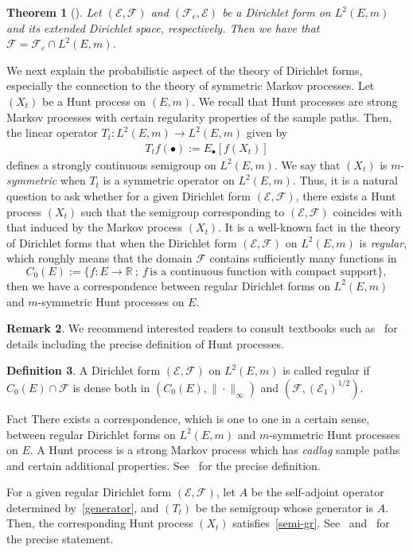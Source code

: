 \documentclass[10pt]{amsart}
\newtheorem{theo}{Theorem}[section]
\theoremstyle{definition}\newtheorem{defi}[theo]{Definition}\newtheorem{rema}[theo]{Remark}\newtheorem{exam}[theo]{Example}\newtheorem{exem}[theo]{Example}\newtheorem{nota}[theo]{Notation}
\newcommand{\ce}{\mathcal{E}}
\newcommand{\cf}{\mathcal{F}}
\newcommand{\br}{\mathbb{R}}
\begin{document}
\begin{theo}[{\cite[Theorem~1.5.2]{FOT}}]\label{ex-dr}
Let $(\ce,\cf)$ and $(\cf_e,\ce)$ be a Dirichlet form on $L^2(E,m)$ and its extended Dirichlet space, respectively. Then we have that $\cf=\cf_e\cap L^2(E,m)$.
\end{theo}

We next explain the probabilistic aspect of the theory of Dirichlet forms, especially the connection to the theory of symmetric Markov processes. Let $(X_t)$ be a Hunt process on $(E,m)$. We recall that Hunt processes are strong Markov processes with certain regularity properties of the sample paths. Then, the linear operator $T_t:L^2(E,m)\to L^2(E,m)$ given by
\begin{align}\label{semi-gr}
T_tf(\bullet):=E_{\bullet}[f(X_t)]
\end{align}
defines a strongly continuous semigroup on $L^2(E,m)$. We say that $(X_t)$ is $m$-\emph{symmetric} when $T_t$ is a symmetric operator on $L^2(E,m)$. Thus, it is a natural question to ask whether for a given Dirichlet form $(\ce,\cf)$, there exists a Hunt process $(X_t)$ such that the semigroup corresponding to $(\ce,\cf)$ coincides with that induced by the Markov process $(X_t)$. It is a well-known fact in the theory of Dirichlet forms that when the Dirichlet form $(\ce,\cf)$ on $L^2(E,m)$ is \emph{regular}, which roughly means that the domain $\cf$ contains sufficiently many functions in
\[
C_0(E):=\{f:E\to\br\ ;\ f\,\text{is\ a\ continuous\ function\ with\ compact\ support}\},
\]
then we have a correspondence between regular Dirichlet forms on $L^2(E,m)$ and $m$-symmetric Hunt processes on $E$.

\begin{rema}
We recommend interested readers to consult textbooks such as~\cite{CF,FOT} for details including the precise definition of Hunt processes.
\end{rema}

\begin{defi}\label{def-reg}
A Dirichlet form $(\ce,\cf)$ on $L^2(E,m)$ is called regular if $C_0(E)\cap\cf$ is dense both in $(C_0(E),\|\cdot\|_{\infty})$ and $(\cf,(\ce_1)^{1/2})$.
\end{defi}

\begin{enonce}[plain]{Fact}
There exists a correspondence, which is one to one in a certain sense, between regular Dirichlet forms on $L^2(E,m)$ and $m$-symmetric Hunt processes on $E$. A Hunt process is a strong Markov process which has \emph{cadlag} sample paths and certain additional properties. See~\cite[Appendix A.2]{FOT} for the precise definition.

For a given regular Dirichlet form $(\ce,\cf)$, let $A$ be the self-adjoint operator determined by~\eqref{generator}, and $(T_t)$ be the semigroup whose generator is $A$. Then, the corresponding Hunt process $(X_t)$ satisfies~\eqref{semi-gr}. See~\cite[Chapter~7]{FOT} and~\cite[Theorem~1.5.1]{CF} for the precise statement.
\end{enonce}
\end{document}
